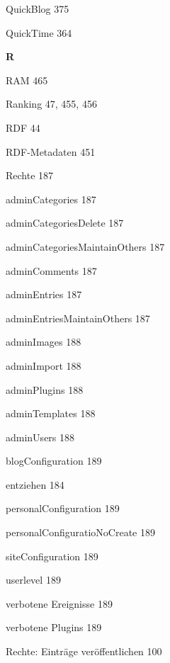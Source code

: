 \documentclass{book}
\renewcommand\indexspace{\vspace{11pt}}
\renewcommand\subitem{\par}
\begin{document}
\begin{multicols}{2}
\begin{osp-index}
  \item QuickBlog\hspace{1mm} 375
  \item QuickTime\hspace{1mm} 364

  \indexspace
{\sffamily\bfseries R}\nopagebreak

  \item RAM\hspace{1mm} 465
  \item Ranking\hspace{1mm} 47, 455, 456
  \item RDF\hspace{1mm} 44
  \item RDF-Metadaten\hspace{1mm} 451
  \item Rechte\hspace{1mm} 187
    \subitem adminCategories\hspace{1mm} 187
    \subitem adminCategoriesDelete\hspace{1mm} 187
    \subitem adminCategoriesMaintainOthers\hspace{1mm} 187
    \subitem adminComments\hspace{1mm} 187
    \subitem adminEntries\hspace{1mm} 187
    \subitem adminEntriesMaintainOthers\hspace{1mm} 187
    \subitem adminImages\hspace{1mm} 188
    \subitem adminImport\hspace{1mm} 188
    \subitem adminPlugins\hspace{1mm} 188
    \subitem adminTemplates\hspace{1mm} 188
    \subitem adminUsers\hspace{1mm} 188
    \subitem blogConfiguration\hspace{1mm} 189
    \subitem entziehen\hspace{1mm} 184
    \subitem personalConfiguration\hspace{1mm} 189
    \subitem personalConfiguratioNoCreate\hspace{1mm} 189
    \subitem siteConfiguration\hspace{1mm} 189
    \subitem userlevel\hspace{1mm} 189
    \subitem verbotene Ereignisse\hspace{1mm} 189
    \subitem verbotene Plugins\hspace{1mm} 189
  \item Rechte: Eintr\"age ver\"offentlichen\hspace{1mm} 100

\end{osp-index}
\end{multicols}
\end{document}
